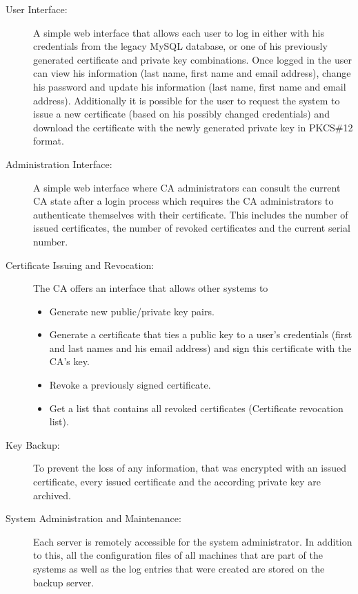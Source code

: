\documentclass[a4paper, toc=index, 12pt, DIV14, twoside, BCOR2cm, headsepline, numbers=noenddot, bibliography=totoc]{report}
\begin{document}
\begin{description}
\item[User Interface: ]
A simple web interface that allows each user to log in either with his credentials from the legacy MySQL database, or one of his previously generated certificate and private key combinations.
Once logged in the user can view his information (last name, first name and email address), change his password and update his information (last name, first name and email address).
Additionally it is possible for the user to request the system to issue a new certificate (based on his possibly changed credentials) and download the certificate with the newly generated private key in PKCS\#12 format.

\item[Administration Interface: ]
A simple web interface where CA administrators can consult the current CA state after a login process which requires the CA administrators to authenticate themselves with their certificate. This includes the number of issued certificates, the number of revoked certificates and the current serial number.

\item[Certificate Issuing and Revocation: ]
The CA offers an interface that allows other systems to
\begin{itemize}
\item Generate new public/private key pairs.
\item Generate a certificate that ties a public key to a user's credentials (first and last names and his email address) and sign this certificate with the CA's key.
\item Revoke a previously signed certificate.
\item Get a list that contains all revoked certificates (Certificate revocation list).
\end{itemize}

\item[Key Backup: ]
To prevent the loss of any information, that was encrypted with an issued certificate, every issued certificate and the according private key are archived.

\item[System Administration and Maintenance: ]
Each server is remotely accessible for the system administrator. In addition to this, all the configuration files of all machines that are part of the systems as well as the log entries that were created are stored on the backup server.
\end{description}
\end{document}
